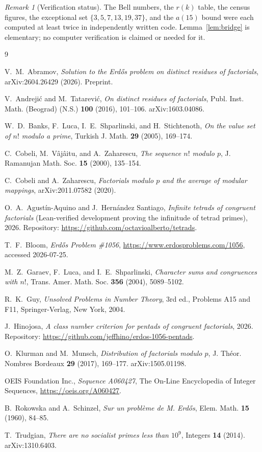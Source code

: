 \documentclass[11pt]{article}
\theoremstyle{definition}
\theoremstyle{remark}
\newtheorem{remark}[theorem]{Remark}
\begin{document}
\begin{remark}[Verification status]
The Bell numbers, the $r(k)$ table, the census figures, the exceptional
set $\{3,5,7,13,19,37\}$, and the $a(15)$ bound were each computed at
least twice in independently written code. Lemma~\ref{lem:bridge} is
elementary; no computer verification is claimed or needed for it.
\end{remark}

\begin{thebibliography}{9}

V.~M.~Abramov,
\emph{Solution to the Erd\H{o}s problem on distinct residues of
factorials},
arXiv:2604.26429 (2026). Preprint.

V.~Andreji\'c and M.~Tatarevi\'c,
\emph{On distinct residues of factorials},
Publ. Inst. Math. (Beograd) (N.S.) \textbf{100} (2016), 101--106.
arXiv:1603.04086.

W.~D.~Banks, F.~Luca, I.~E.~Shparlinski, and H.~Stichtenoth,
\emph{On the value set of $n!$ modulo a prime},
Turkish J. Math. \textbf{29} (2005), 169--174.

C.~Cobeli, M.~V\^aj\^aitu, and A.~Zaharescu,
\emph{The sequence $n!$ modulo $p$},
J. Ramanujan Math. Soc. \textbf{15} (2000), 135--154.

C.~Cobeli and A.~Zaharescu,
\emph{Factorials modulo $p$ and the average of modular mappings},
arXiv:2011.07582 (2020).

O.~A.~Agust\'in-Aquino and J.~Hern\'andez Santiago,
\emph{Infinite tetrads of congruent factorials} (Lean-verified development
proving the infinitude of tetrad primes),
2026. Repository: \url{https://github.com/octavioalberto/tetrads}.

T.~F.~Bloom,
\emph{Erd\H{o}s Problem \#1056},
\url{https://www.erdosproblems.com/1056}, accessed 2026-07-25.

M.~Z.~Garaev, F.~Luca, and I.~E.~Shparlinski,
\emph{Character sums and congruences with $n!$},
Trans. Amer. Math. Soc. \textbf{356} (2004), 5089--5102.

R.~K.~Guy,
\emph{Unsolved Problems in Number Theory},
3rd ed., Problems A15 and F11, Springer-Verlag, New York, 2004.

J.~Hinojosa,
\emph{A class number criterion for pentads of congruent factorials},
2026. Repository:
\url{https://github.com/jeffhino/erdos-1056-pentads}.

O.~Klurman and M.~Munsch,
\emph{Distribution of factorials modulo $p$},
J. Th\'eor. Nombres Bordeaux \textbf{29} (2017), 169--177.
arXiv:1505.01198.

OEIS Foundation Inc.,
\emph{Sequence A060427},
The On-Line Encyclopedia of Integer Sequences,
\url{https://oeis.org/A060427}.

B.~Rokowska and A.~Schinzel,
\emph{Sur un probl\`eme de M. Erd\H{o}s},
Elem. Math. \textbf{15} (1960), 84--85.

T.~Trudgian,
\emph{There are no socialist primes less than $10^9$},
Integers \textbf{14} (2014). arXiv:1310.6403.

\end{thebibliography}
\end{document}
